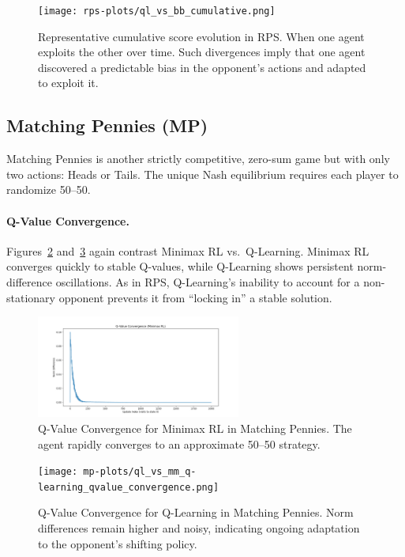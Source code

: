\documentclass[11pt]{article}
\begin{document}
\begin{figure}[htbp]
    \centering
    \texttt{[image: rps-plots/ql\_vs\_bb\_cumulative.png]}
    \caption{Representative cumulative score evolution in RPS. When one 
    agent exploits the other over time. Such divergences imply that one 
    agent discovered a predictable bias in the opponent's actions and 
    adapted to exploit it.}
    \label{fig:rps-ql-bb-cumulative}
\end{figure}

\subsection{Matching Pennies (MP)}

Matching Pennies is another strictly competitive, zero-sum game but with 
only two actions: Heads or Tails. The unique Nash equilibrium requires 
each player to randomize 50--50.

\paragraph{Q-Value Convergence.}
Figures~\ref{fig:mp-minimax-convergence} and~\ref{fig:mp-ql-convergence} 
again contrast Minimax RL vs.\ Q-Learning. Minimax RL converges quickly 
to stable Q-values, while Q-Learning shows persistent norm-difference 
oscillations. As in RPS, Q-Learning's inability to account for a 
non-stationary opponent prevents it from ``locking in'' a stable solution.

\begin{figure}[htbp]
    \centering
    \includegraphics[width=0.6\textwidth]{mp-plots/ql_vs_mm_minimax_rl_qvalue_convergence.png}
    \caption{Q-Value Convergence for Minimax RL in Matching Pennies. The 
    agent rapidly converges to an approximate 50--50 strategy.}
    \label{fig:mp-minimax-convergence}
\end{figure}

\begin{figure}[htbp]
    \centering
    \texttt{[image: mp-plots/ql\_vs\_mm\_q-learning\_qvalue\_convergence.png]}
    \caption{Q-Value Convergence for Q-Learning in Matching Pennies. 
    Norm differences remain higher and noisy, indicating ongoing 
    adaptation to the opponent's shifting policy.}
    \label{fig:mp-ql-convergence}
\end{figure}
\end{document}
